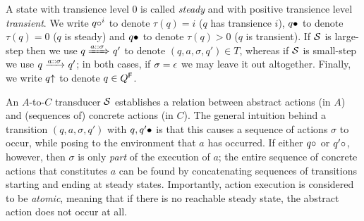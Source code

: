 A state with transience level $0$ is called \emph{steady} and with positive transience level \emph{transient}. We write $q\trnt[i]$ to denote $\tau(q)=i$ ($q$ has transience $i$), $q\stdy$ to denote $\tau(q)=0$ ($q$ is steady) and $q\stdy$ to denote $\tau(q)>0$ ($q$ is transient). If $\cS$ is large-step then we use $q\Tduce a\sigma q'$ to denote $(q,a,\sigma,q')\in T$, whereas if $\cS$ is small-step we use $q\tduce a\sigma q'$; in both cases, if $\sigma=\emptystr$ we may leave it out altogether. Finally, we write $q\final$ to denote $q\in Q^\Final$.

An $A$-to-$C$ transducer $\cS$ establishes a relation between abstract actions (in $A$) and (sequences of) concrete actions (in $C$). The general intuition behind a transition $(q,a,\sigma,q')$ with $q,q'\stdy$ is that this causes a sequence of actions $\sigma$ to occur, while posing to the environment that $a$ has occurred. If either $q\trnt$ or $q'\trnt$, however, then $\sigma$ is only \emph{part} of the execution of $a$; the entire sequence of concrete actions that constitutes $a$ can be found by concatenating sequences of transitions starting and ending at steady states. Importantly, action execution is considered to be \emph{atomic}, meaning that if there is no reachable steady state, the abstract action does not occur at all.

